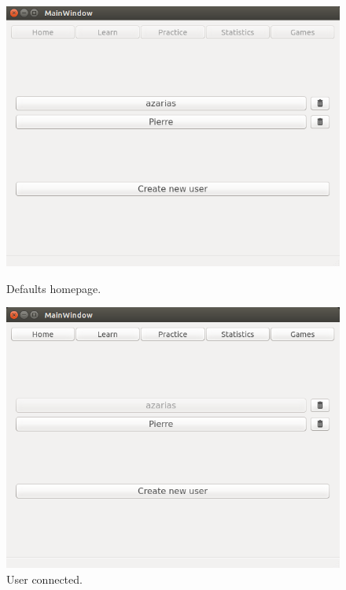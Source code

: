 \begin{figure}[H]
  \centering
  \begin{minipage}[b]{0.45\textwidth}
    \includegraphics[width=\textwidth]{images/homepage_logout.png}
    \caption{Defaults homepage.}
    \label{homepage-logout}
  \end{minipage}
  \hfill
  \begin{minipage}[b]{0.45\textwidth}
    \includegraphics[width=\textwidth]{images/homepage_login.png}
    \caption{User connected.}
    \label{homepage-login}
  \end{minipage}
\end{figure}


